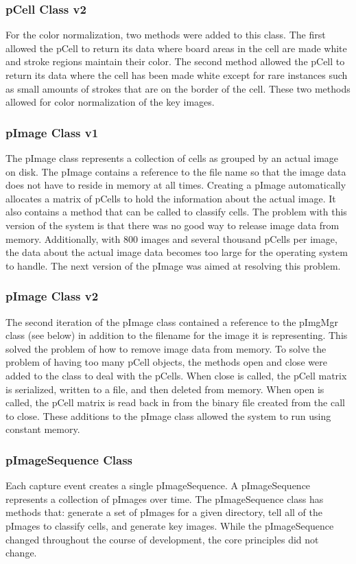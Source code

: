 \documentclass[]{article}
\begin{document}
			\subsubsection{pCell Class v2}
				For the color normalization, two methods were added to this class. The first allowed the pCell to return its data where board areas in the cell are made white and stroke regions maintain their color. The second method allowed the pCell to return its data where the cell has been made white except for rare instances such as small amounts of strokes that are on the border of the cell. These two methods allowed for color normalization of the key images.
				
			\subsubsection{pImage Class v1}
				The pImage class represents a collection of cells as grouped by an actual image on disk. The pImage contains a reference to the file name so that the image data does not have to reside in memory at all times. Creating a pImage automatically allocates a matrix of pCells to hold the information about the actual image. It also contains a method that can be called to classify cells. The problem with this version of the system is that there was no good way to release image data from memory. Additionally, with 800 images and several thousand pCells per image, the data about the actual image data becomes too large for the operating system to handle. The next version of the pImage was aimed at resolving this problem.
			
			\subsubsection{pImage Class v2}
				The second iteration of the pImage class contained a reference to the pImgMgr class (see below) in addition to the filename for the image it is representing. This solved the problem of how to remove image data from memory. To solve the problem of having too many pCell objects, the methods open and close were added to the class to deal with the pCells. When close is called, the pCell matrix is serialized, written to a file, and then deleted from memory. When open is called, the pCell matrix is read back in from the binary file created from the call to close. These additions to the pImage class allowed the system to run using constant memory. 
			
			\subsubsection{pImageSequence Class}
				Each capture event creates a single pImageSequence. A pImageSequence represents a collection of pImages over time. The pImageSequence class has methods that: generate a set of pImages for a given directory, tell all of the pImages to classify cells, and generate key images. While the pImageSequence changed throughout the course of development, the core principles did not change.
				
\end{document}
